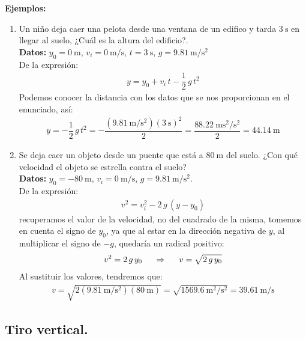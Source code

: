 \documentclass[14pt]{extarticle}
\begin{document}
\noindent
\textbf{Ejemplos: }
\begin{enumerate}[label=\roman*)]
\item Un niño deja caer una pelota desde una ventana de un edifico y tarda $\SI{3}{\second}$ en llegar al suelo, ¿Cuál es la altura del edificio?.
\\[0.5em]
\textbf{Datos:} $y_{0} = \SI{0}{\meter}$, $v_{i} = \SI{0}{\meter\per\second}$, $t = \SI{3}{\second}$, $g = \SI{9.81}{\meter\per\square\second}$
\\[0.5em]
De la expresión:
\begin{align*}
y = y_{0} + v_{i} \, t - \dfrac{1}{2} \, g \, t^{2}
\end{align*}
Podemos conocer la distancia con los datos que se nos proporcionan en el enunciado, así:
\begin{align*}
y = - \dfrac{1}{2} \, g \, t^{2} = - \dfrac{(\SI{9.81}{\meter\per\square\second}) (\SI{3}{\second})^{2}}{2} = \dfrac{\SI{88.22}{\meter\square\second\per\square\second}}{2} = \SI{44.14}{\meter}
\end{align*}
\item Se deja caer un objeto desde un puente que está a $\SI{80}{\meter}$ del suelo. ¿Con qué velocidad el objeto se estrella contra el suelo?
\\[0.5em]
\textbf{Datos:} $y_{0} = -\SI{80}{\meter}$, $v_{i} = \SI{0}{\meter\per\second}$, $g = \SI{9.81}{\meter\per\square\second}$.
\\[0.5em]
De la expresión:
\begin{align*}
v^{2} = v_{i}^{2} - 2 \, g \, (y - y_{0})
\end{align*}
recuperamos el valor de la velocidad, no del cuadrado de la misma, tomemos en cuenta el signo de $y_{0}$, ya que al estar en la dirección negativa de $y$, al multiplicar el signo de $-g$, quedaría un radical positivo:
\begin{align*}
v^{2} = 2 \, g \, y_{0} \hspace{0.5cm} \Rightarrow \hspace{0.5cm} v = \sqrt{ 2 \, g \, y_{0}} 
\end{align*}
Al sustituir los valores, tendremos que:
\begin{align*}
v = \sqrt{2 (\SI{9.81}{\meter\per\square\second}) (\SI{80}{\meter})} = \sqrt{\SI{1569.6}{\square\meter\per\square\second}} = \SI{39.61}{\meter\per\second}
\end{align*}
\end{enumerate}

\subsection{Tiro vertical.}
\end{document}
